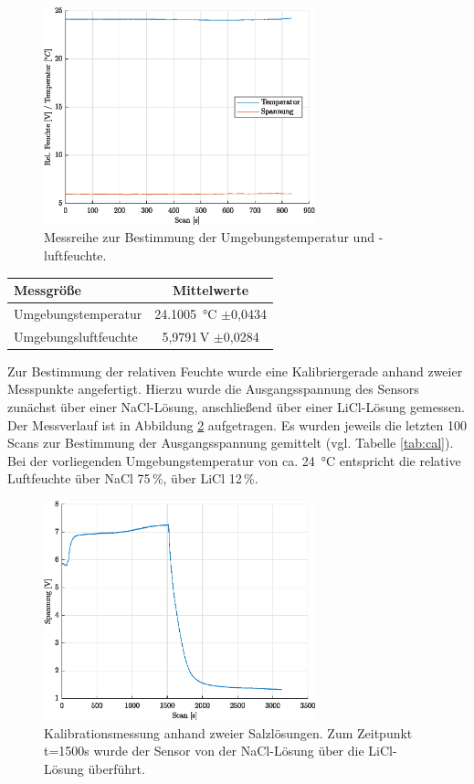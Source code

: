 \begin{figure}[H]
	\centering
	\includegraphics[width=0.7\textwidth]{../DATA/Messreihe_Umgebung.eps}
	\caption[Messreihe Umgebung]{Messreihe zur Bestimmung der Umgebungstemperatur und -luftfeuchte.}
	\label{fig:amb}
\end{figure}

\begin{center}
	\begin{tabular}{l|c}
		\label{tab:amb}
		
		\textbf{Messgröße} & \textbf{Mittelwerte}\\
		\hline
		Umgebungstemperatur & \SI{24,1005}{\celsius} $\pm$0,0434\\
		Umgebungsluftfeuchte & 5,9791\,V $\pm$0,0284
	\end{tabular}
\end{center}

Zur Bestimmung der relativen Feuchte wurde eine Kalibriergerade anhand zweier Messpunkte angefertigt. Hierzu wurde die Ausgangsspannung des Sensors zunächst über einer NaCl-Lösung, anschließend über einer LiCl-Lösung gemessen. Der Messverlauf ist in Abbildung \ref{fig:cal} aufgetragen. Es wurden jeweils die letzten 100 Scans zur Bestimmung der Ausgangsspannung gemittelt (vgl. Tabelle \ref{tab:cal}). Bei der vorliegenden Umgebungstemperatur von ca. \SI{24}{\celsius} entspricht die relative Luftfeuchte über NaCl 75\,\%, über LiCl 12\,\%. 

\begin{figure}[H]
	\centering
	\includegraphics[width=0.7\textwidth]{../DATA/Messreihe_Feuchtekalibration.eps}
	\caption[Kalibrationsmessung]{Kalibrationsmessung anhand zweier Salzlösungen. Zum Zeitpunkt t=1500s wurde der Sensor von der NaCl-Lösung über die LiCl-Lösung überführt.}
	\label{fig:cal}
\end{figure}

